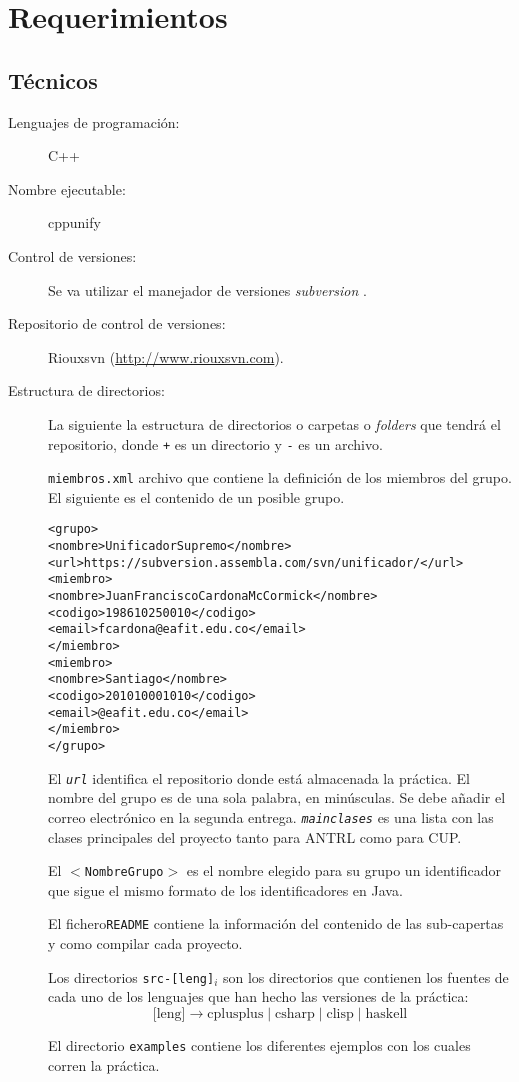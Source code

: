 \documentclass{article}
\begin{document}
\section{Requerimientos}
\label{sec:requerimientos}


\subsection{Técnicos}
\label{sec:reqtec}

\begin{description}
\item[Lenguajes de programación:] C++
\item[Nombre ejecutable:] cppunify
\item[Control de versiones:] Se va utilizar el manejador de versiones \emph{subversion} \cite{pilato}.
\item[Repositorio de control de versiones:] Riouxsvn (\url{http://www.riouxsvn.com}).
\item[Estructura de directorios:] La siguiente la estructura de
  directorios o carpetas o \emph{folders} que tendrá el repositorio, donde
  \texttt{+} es un directorio y \texttt{-} es un archivo.
\begin{alltt}
\end{alltt}

  \texttt{miembros.xml} archivo que contiene la definición de los
  miembros del grupo. El siguiente es el contenido de un posible grupo.

  {\footnotesize
\begin{alltt}
<grupo>
   <nombre>UnificadorSupremo</nombre>
   <url>https://subversion.assembla.com/svn/unificador/</url>
   <miembro>
      <nombre>Juan Francisco Cardona McCormick</nombre>
      <codigo>198610250010</codigo>
      <email>fcardona@eafit.edu.co</email>
   </miembro>
   <miembro>
      <nombre>Santiago </nombre>
      <codigo>201010001010</codigo>
      <email>@eafit.edu.co</email>
   </miembro>
</grupo>
\end{alltt}
  }

  El \emph{\texttt{url}} identifica el repositorio donde está
  almacenada la práctica.  El nombre del grupo es de una sola palabra,
  en minúsculas. Se debe añadir el correo electrónico en la segunda
  entrega. \emph{\texttt{mainclases}} es una lista con las clases
  principales del proyecto tanto para ANTRL como para CUP.

  El \texttt{$<$NombreGrupo$>$} es el nombre elegido para su grupo un identificador que
  sigue el mismo formato de los identificadores en Java.

  El fichero\texttt{README} contiene la información del contenido de las
  sub-capertas y como compilar cada proyecto.

  Los directorios \texttt{src-[leng]$_i$} son los directorios que
  contienen los fuentes de cada uno de los lenguajes que han hecho las
  versiones de la práctica:
  \[
    \text{[leng]} \to \text{cplusplus} \mid \text{csharp} \mid \text{clisp} \mid \text{haskell}
  \]

  El directorio \texttt{examples} contiene los diferentes ejemplos con
  los cuales corren la práctica.

\end{description}
\end{document}
